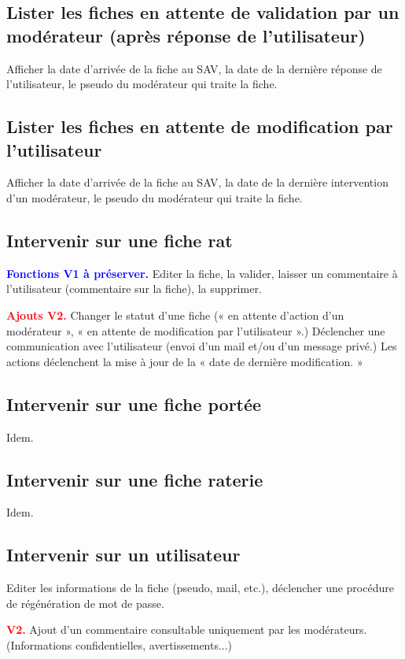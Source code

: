 \documentclass[a4paper,10pt]{article}
\newcommand\existant[1]{\noindent\textbf{\textcolor{blue}{#1}}}
\newcommand\desire[1]{\noindent\textbf{\textcolor{red}{#1}}}
\begin{document}
\subsection{Lister les fiches en attente de validation par un modérateur (après réponse de l'utilisateur)}
Afficher la date d'arrivée de la fiche au SAV, la date de la dernière réponse de l'utilisateur, le pseudo du modérateur qui traite la fiche.

\subsection{Lister les fiches en attente de modification par l'utilisateur}
Afficher la date d'arrivée de la fiche au SAV, la date de la dernière intervention d'un modérateur, le pseudo du modérateur qui traite la fiche.

\subsection{Intervenir sur une fiche rat}
\existant{Fonctions V1 à préserver.} Editer la fiche, la valider, laisser un commentaire à l'utilisateur (commentaire sur la fiche), la supprimer.

\desire{Ajouts V2.} Changer le statut d'une fiche (« en attente d'action d'un modérateur », « en attente de modification par l'utilisateur ».) Déclencher une communication avec l'utilisateur (envoi d'un mail et/ou d'un message privé.) Les actions déclenchent la mise à jour de la « date de dernière modification. »   

\subsection{Intervenir sur une fiche portée}
Idem.

\subsection{Intervenir sur une fiche raterie}
Idem.

\subsection{Intervenir sur un utilisateur}
Editer les informations de la fiche (pseudo, mail, etc.), déclencher une procédure de régénération de mot de passe.

\desire{V2.} Ajout d'un commentaire consultable uniquement par les modérateurs. (Informations confidentielles, avertissements...)
\end{document}
